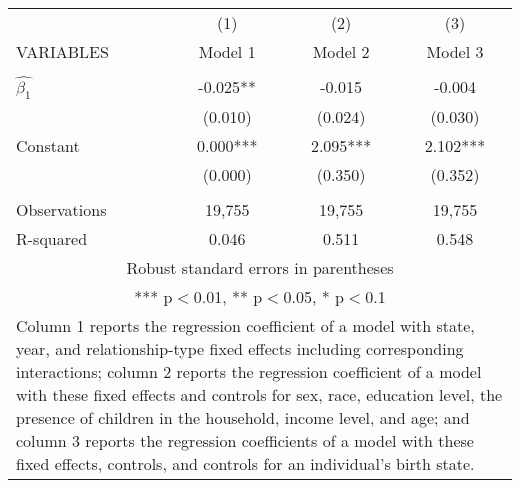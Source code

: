 \begin{tabular}{lccc}
\hline
 & (1) & (2) & (3) \\
VARIABLES & Model 1 & Model 2 & Model 3 \\ \hline
 &  &  &  \\
$\hat{\beta_1}$ & -0.025** & -0.015 & -0.004 \\
 & (0.010) & (0.024) & (0.030) \\
Constant & 0.000*** & 2.095*** & 2.102*** \\
 & (0.000) & (0.350) & (0.352) \\
 &  &  &  \\
Observations & 19,755 & 19,755 & 19,755 \\
 R-squared & 0.046 & 0.511 & 0.548 \\ \hline
\multicolumn{4}{c}{ Robust standard errors in parentheses} \\
\multicolumn{4}{c}{ *** p$<$0.01, ** p$<$0.05, * p$<$0.1} \\
\multicolumn{4}{p{0.6\linewidth}}{\footnotesize Column 1 reports the regression coefficient of a model with state, year, and relationship-type fixed effects including corresponding interactions; column 2 reports the regression coefficient of a model with these fixed effects and controls for sex, race, education level, the presence of children in the household, income level, and age; and column 3 reports the regression coefficients of a model with these fixed effects, controls, and controls for an individual’s birth state.} \\
\end{tabular}
